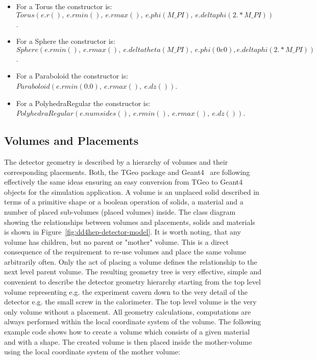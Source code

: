 \documentclass[10pt,a4paper]{article}
\begin{document}
\begin{itemize}
\item For a Torus the constructor is:\\
  $ Torus(e.r(),~e.rmin(),~e.rmax(),~e.phi(M\_PI),~e.deltaphi(2.*M\_PI))$.

\item For a Sphere the constructor is:\\
  $ Sphere(e.rmin(),~e.rmax(),~e.deltatheta(M\_PI),~e.phi(0e0),e.deltaphi(2.*M\_PI))$.

\item For a Paraboloid the constructor is:\\
  $ Paraboloid(e.rmin(0.0),~e.rmax(),~e.dz())$.

\item For a PolyhedraRegular the constructor is:\\
  $ PolyhedraRegular(e.numsides(),~e.rmin(),~e.rmax(),~e.dz())$.

\end{itemize}

\newpage
\subsection{Volumes and Placements}
\noindent
The detector geometry is described by a hierarchy of volumes and their 
corresponding placements. Both, the TGeo package and Geant4~\cite{bib:geant4} 
are following effectively the same ideas ensuring an easy conversion from 
TGeo to Geant4 objects for the simulation application.
\noindent
A volume is an unplaced solid de\-scribed in terms of a primitive 
shape or a boolean operation of solids, a material and a number of
placed sub-volumes (placed volumes) inside. The class diagram showing the 
relationships between volumes and placements, solids and materials is shown 
in Figure~\ref{fig:dd4hep-detector-model}.
\noindent
It is worth noting, that any volume has children, but no parent or "mother"
volume. This is a direct consequence of the requirement to re-use volumes
and place the same volume arbitrarily often. Only the act of placing a volume
defines the relationship to the next level parent volume.
The resulting geometry tree is very effective, simple and convenient to 
describe the detector geometry hierarchy starting from the top level volume
representing e.g. the experiment cavern down to the very detail of the detector
e.g. the small screw in the calorimeter. The top level volume is the very only
volume without a placement. All geometry calculations, computations are always 
performed within the local coordinate system of the volume.
The following example code shows how to create
a volume which consists of a given material and with a shape. The created volume 
is then placed inside the mother-volume using the local coordinate system of the
mother volume:
\end{document}
